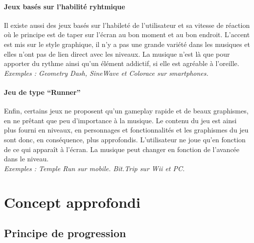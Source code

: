 \documentclass[a4paper,11pt]{article}
\begin{document}
\paragraph{Jeux basés sur l’habilité ryhtmique}
Il existe aussi des jeux basés sur l’habileté de l’utilisateur et sa vitesse de réaction où le principe est de taper sur l’écran au bon moment et au bon endroit. L'accent est mis sur le style graphique, il n'y a pas une grande variété dans les musiques et elles n'ont pas de lien direct avec les niveaux. La musique n'est là que pour apporter du rythme ainsi qu’un élément addictif, si elle est agréable à l’oreille.\\
\textit{Exemples : Geometry Dash, SineWave et Colorace sur smartphones.}
\paragraph{Jeu de type “Runner”}
Enfin, certains jeux ne proposent qu’un gameplay rapide et de beaux graphismes, en ne prêtant que peu d’importance à la musique. Le contenu du jeu est ainsi plus fourni en niveaux, en personnages et fonctionnalités et les graphismes du jeu sont donc, en conséquence, plus approfondis. L’utilisateur ne joue qu’en fonction de ce qui apparaît à l’écran. La musique peut changer en fonction de l’avancée dans le niveau.\\
\textit{Exemples : Temple Run sur mobile. Bit.Trip sur Wii et PC.}

\section{Concept approfondi}
\subsection{Principe de progression}
\end{document}
